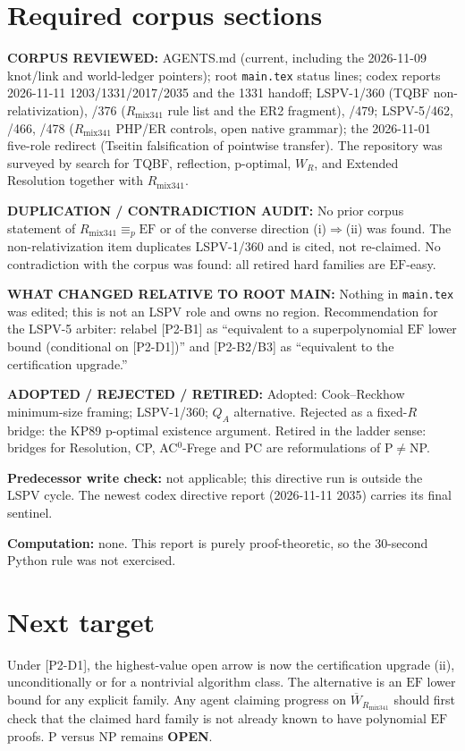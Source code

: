 \documentclass[11pt]{article}
\theoremstyle{definition}
\theoremstyle{remark}
\newcommand{\EF}{\mathrm{EF}}
\newcommand{\Rmix}{R_{\mathrm{mix341}}}
\newcommand{\Wbar}{\overline W}
\begin{document}
\section{Required corpus sections}
\textbf{CORPUS REVIEWED:} AGENTS.md (current, including the 2026-11-09 knot/link and world-ledger
pointers); root \texttt{main.tex} status lines; codex reports 2026-11-11 1203/1331/2017/2035 and the 1331
handoff; LSPV-1/360 (TQBF non-relativization), /376 ($\Rmix$ rule list and the ER2 fragment), /479;
LSPV-5/462, /466, /478 ($\Rmix$ PHP/ER controls, open native grammar); the 2026-11-01 five-role redirect
(Tseitin falsification of pointwise transfer). The repository was surveyed by search for
TQBF, reflection, p-optimal, $W_R$, and Extended Resolution together with $\Rmix$.

\textbf{DUPLICATION / CONTRADICTION AUDIT:} No prior corpus statement of $\Rmix\equiv_p\EF$ or of
the converse direction (i)$\Rightarrow$(ii) was found. The non-relativization item duplicates LSPV-1/360
and is cited, not re-claimed. No contradiction with the corpus was found: all retired hard families are
$\EF$-easy.

\textbf{WHAT CHANGED RELATIVE TO ROOT MAIN:} Nothing in \texttt{main.tex} was edited; this is not an
LSPV role and owns no region. Recommendation for the LSPV-5 arbiter: relabel [P2-B1] as
``equivalent to a superpolynomial $\EF$ lower bound (conditional on [P2-D1])'' and [P2-B2/B3] as
``equivalent to the certification upgrade.''

\textbf{ADOPTED / REJECTED / RETIRED:} Adopted: Cook--Reckhow minimum-size framing; LSPV-1/360;
$Q_A$ alternative. Rejected as a fixed-$R$ bridge: the KP89 p-optimal existence argument. Retired in
the ladder sense: bridges for Resolution, CP, AC$^0$-Frege and PC are reformulations of P$\ne$NP.

\textbf{Predecessor write check:} not applicable; this directive run is outside the LSPV cycle.
The newest codex directive report (2026-11-11 2035) carries its final sentinel.

\textbf{Computation:} none. This report is purely proof-theoretic, so the 30-second Python rule was not exercised.

\section*{Next target}
Under [P2-D1], the highest-value open arrow is now the certification upgrade (ii), unconditionally
or for a nontrivial algorithm class. The alternative is an $\EF$ lower bound for any explicit family.
Any agent claiming progress on $\Wbar_{\Rmix}$ should first check that the claimed hard family is not
already known to have polynomial $\EF$ proofs.
P versus NP remains \textbf{OPEN}.

\end{document}
